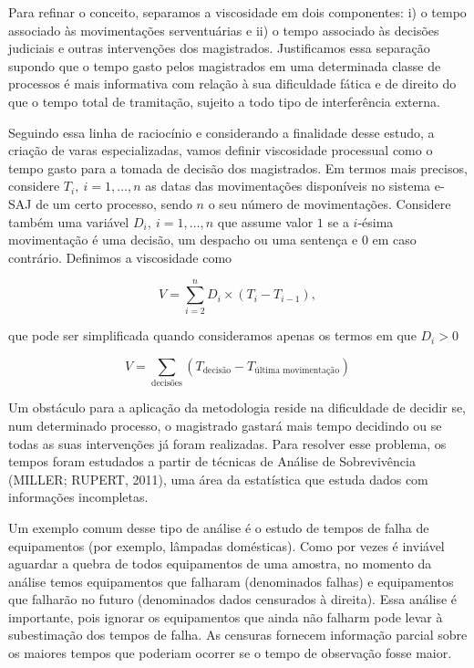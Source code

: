 \documentclass[]{book}
\begin{document}
Para refinar o conceito, separamos a viscosidade em dois componentes: i)
o tempo associado às movimentações serventuárias e ii) o tempo associado
às decisões judiciais e outras intervenções dos magistrados.
Justificamos essa separação supondo que o tempo gasto pelos magistrados
em uma determinada classe de processos é mais informativa com relação à
sua dificuldade fática e de direito do que o tempo total de tramitação,
sujeito a todo tipo de interferência externa.

Seguindo essa linha de raciocínio e considerando a finalidade desse
estudo, a criação de varas especializadas, vamos definir viscosidade
processual como o tempo gasto para a tomada de decisão dos magistrados.
Em termos mais precisos, considere \(T_i, \ i = 1,\dots,n\) as datas das
movimentações disponíveis no sistema e-SAJ de um certo processo, sendo
\(n\) o seu número de movimentações. Considere também uma variável
\(D_i, \ i = 1,\dots,n\) que assume valor \(1\) se a \(i\)-ésima
movimentação é uma decisão, um despacho ou uma sentença e \(0\) em caso
contrário. Definimos a viscosidade como

\[ 
V = \sum\limits_{i=2}^n D_i \times (T_i - T_{i-1}), 
\]

\noindent que pode ser simplificada quando consideramos apenas os termos
em que \(D_i > 0\)

\[ 
V = \sum\limits_{\text{decisões}} (T_{\text{decisão}} - T_{\text{última movimentação}})
\]

Um obstáculo para a aplicação da metodologia reside na dificuldade de
decidir se, num determinado processo, o magistrado gastará mais tempo
decidindo ou se todas as suas intervenções já foram realizadas. Para
resolver esse problema, os tempos foram estudados a partir de técnicas
de Análise de Sobrevivência (MILLER; RUPERT, 2011), uma área da
estatística que estuda dados com informações incompletas.

Um exemplo comum desse tipo de análise é o estudo de tempos de falha de
equipamentos (por exemplo, lâmpadas domésticas). Como por vezes é
inviável aguardar a quebra de todos equipamentos de uma amostra, no
momento da análise temos equipamentos que falharam (denominados falhas)
e equipamentos que falharão no futuro (denominados dados censurados à
direita). Essa análise é importante, pois ignorar os equipamentos que
ainda não falharm pode levar à subestimação dos tempos de falha. As
censuras fornecem informação parcial sobre os maiores tempos que
poderiam ocorrer se o tempo de observação fosse maior.
\end{document}
